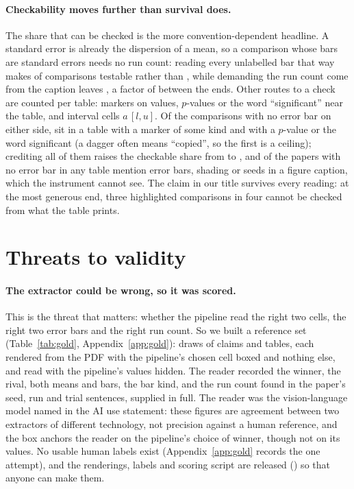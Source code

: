 \documentclass{article}
\begin{document}
\paragraph{Checkability moves further than survival does.} The share that can be
checked is the more convention-dependent headline. A standard error is already
the dispersion of a mean, so a comparison whose bars are standard errors needs
no run count: reading every unlabelled bar that way makes \nTestableAsSem{} of
comparisons testable rather than \nPctTestable{}, while demanding the run count
come from the caption leaves \nStrictTestable{}, a factor of
\nTestableSpanFactor{} between the ends. Other routes to a check are counted
per table: markers on values, $p$-values or the word ``significant'' near the
table, and interval cells $a\,[l, u]$. Of the comparisons with no error bar on
either side, \nNoBarAnyMarker{} sit in a table with a marker of some kind and
\nNoBarStrictMarker{} with a $p$-value or the word significant (a dagger often
means ``copied'', so the first is a ceiling); crediting all of them raises the
checkable share from \nPctTestable{} to \nTestableOrAnyMarker{}, and
\nPctNoBarPapersFigureUncertainty{} of the papers with no error bar in any
table mention error bars, shading or seeds in a figure caption, which the
instrument cannot see. The claim in our title survives every reading: at the
most generous end, three highlighted comparisons in four cannot be checked
from what the table prints.

\section{Threats to validity}
\label{sec:threats}

\paragraph{The extractor could be wrong, so it was scored.} This is the threat
that matters: whether the pipeline read the right two cells, the right two
error bars and the right run count. So we built a reference set
(Table~\ref{tab:gold}, Appendix~\ref{app:gold}): draws of claims and tables,
each rendered from the PDF with the pipeline's chosen cell boxed and nothing
else, and read with the pipeline's values hidden. The reader recorded the
winner, the rival, both means and bars, the bar kind, and the run count found
in the paper's seed, run and trial sentences, supplied in full. The reader was
the vision-language model named in the AI use statement: these figures are
agreement between two extractors of different technology, not precision
against a human reference, and the box anchors the reader on the pipeline's
choice of winner, though not on its values. No usable human labels exist
(Appendix~\ref{app:gold} records the one attempt), and the renderings, labels
and scoring script are released (\nReleaseUrl{}) so that anyone can make
them.
\end{document}
